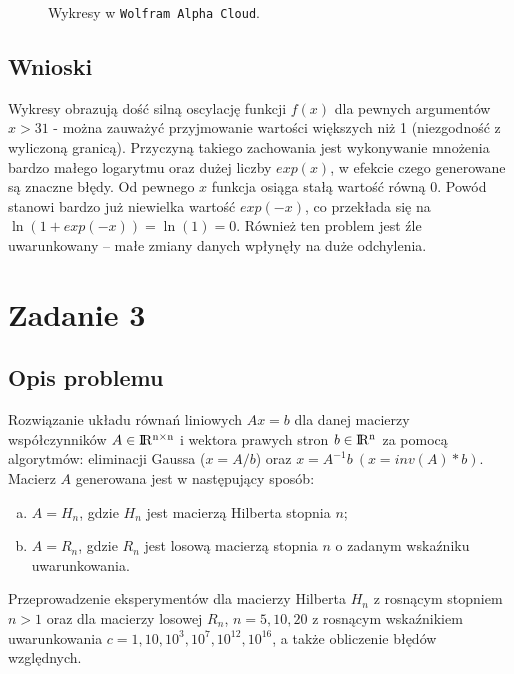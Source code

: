 \documentclass{classrep}
\begin{document}
		\begin{figure}[hpbt]
			\centering
			 \hfill
  			\caption{Wykresy w \texttt{Wolfram Alpha Cloud}.}
  			\label{fig:3}
		\end{figure}
		
	\subsection{Wnioski}
		Wykresy obrazują dość silną oscylację funkcji $f(x)$ dla pewnych argumentów $x > 31$ - można zauważyć przyjmowanie wartości większych niż 1 (niezgodność z wyliczoną granicą). Przyczyną takiego zachowania jest wykonywanie mnożenia bardzo małego logarytmu oraz dużej liczby $exp(x)$, w efekcie czego generowane są znaczne błędy. Od pewnego $x$ funkcja osiąga stałą wartość równą 0. Powód stanowi bardzo już niewielka wartość $exp(-x)$, co przekłada się na $\ln(1+exp(-x))=\ln(1)=0$. Również ten problem jest źle uwarunkowany -- małe zmiany danych wpłynęły na duże odchylenia.
		
\section{Zadanie 3}
	\subsection{Opis problemu}
		Rozwiązanie układu równań liniowych $Ax = b$ dla danej macierzy współczynników $A \in {\rm I\!R^{n \times n}}$ i wektora prawych stron $b \in {\rm I\!R^n}$ za pomocą algorytmów: eliminacji Gaussa ($x=A/b$) oraz $x = A^{-1}b ~(x=inv(A)*b)$. 
		Macierz $A$ generowana jest w następujący sposób:
		\begin{enumerate}[(a)]
			\item $A = H_n$, gdzie $H_n$ jest macierzą Hilberta stopnia $n$;
			\item $A = R_n$, gdzie $R_n$ jest losową macierzą stopnia $n$ o zadanym wskaźniku uwarunkowania.
		\end{enumerate}
		Przeprowadzenie eksperymentów dla macierzy Hilberta $H_n$ z rosnącym stopniem $n > 1$ oraz dla macierzy losowej $R_n$, $n = 5, 10, 20$ z rosnącym wskaźnikiem uwarunkowania $c = 1, 10, 10^3, 10^7, 10^{12}, 10^{16}$, a także obliczenie błędów względnych.
\end{document}
